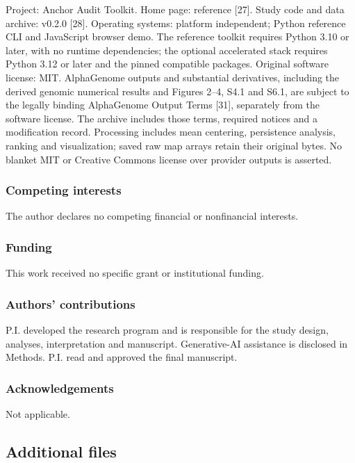 \documentclass[
  11pt,
]{article}
\begin{document}
Project: Anchor Audit Toolkit. Home page: reference {[}27{]}. Study code
and data archive: v0.2.0 {[}28{]}. Operating systems: platform
independent; Python reference CLI and JavaScript browser demo. The
reference toolkit requires Python 3.10 or later, with no runtime
dependencies; the optional accelerated stack requires Python 3.12 or
later and the pinned compatible packages. Original software license:
MIT. AlphaGenome outputs and substantial derivatives, including the
derived genomic numerical results and Figures 2--4, S4.1 and S6.1, are
subject to the legally binding AlphaGenome Output Terms {[}31{]},
separately from the software license. The archive includes those terms,
required notices and a modification record. Processing includes mean
centering, persistence analysis, ranking and visualization; saved raw
map arrays retain their original bytes. No blanket MIT or Creative
Commons license over provider outputs is asserted.

\subsubsection{Competing interests}\label{competing-interests}

The author declares no competing financial or nonfinancial interests.

\subsubsection{Funding}\label{funding}

This work received no specific grant or institutional funding.

\subsubsection{Authors' contributions}\label{authors-contributions}

P.I. developed the research program and is responsible for the study
design, analyses, interpretation and manuscript. Generative-AI
assistance is disclosed in Methods. P.I. read and approved the final
manuscript.

\subsubsection{Acknowledgements}\label{acknowledgements}

Not applicable.

\subsection{Additional files}\label{additional-files}
\end{document}
